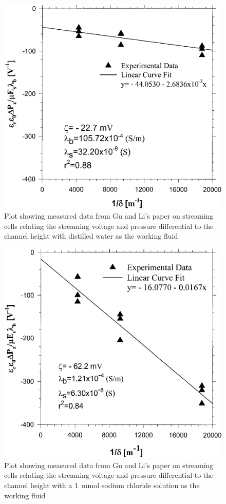   \begin{figure}
      \centering
      \includegraphics{content/pt1/01-PowerHarvesting/graphics/GuLi_DIUF}
      \caption{\label{fig:Gu_Li_comparison_DUIF}Plot showing measured data from Gu and Li's paper on streaming cells relating the streaming voltage and pressure differential to the channel height with distilled water as the working fluid}
  \end{figure}

  \begin{figure}
      \centering
      \includegraphics{content/pt1/01-PowerHarvesting/graphics/GuLi_NaCl}
      \caption{\label{fig:Gu_Li_comparison_NaCl}Plot showing measured data from Gu and Li's paper on streaming cells relating the streaming voltage and pressure differential to the channel height with a \SI{1}{\milli\mole} sodium chloride solution as the working fluid}
  \end{figure}

